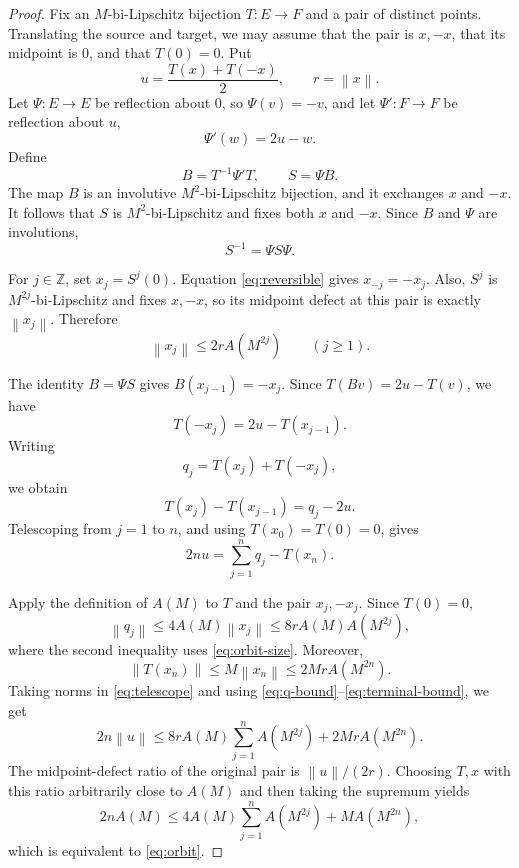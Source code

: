 \documentclass[11pt]{article}
\theoremstyle{remark}
\newcommand{\norm}[1]{\left\lVert #1\right\rVert}
\begin{document}
\begin{proof}
Fix an $M$-bi-Lipschitz bijection $T:E\to F$ and a pair of distinct
points.  Translating the source and target, we may assume that the pair is
$x,-x$, that its midpoint is $0$, and that $T(0)=0$.  Put
\[
 u=\frac{T(x)+T(-x)}2,
 \qquad r=\norm{x}.
\]
Let $\Psi:E\to E$ be reflection about $0$, so $\Psi(v)=-v$, and let
$\Psi':F\to F$ be reflection about $u$,
\[
 \Psi'(w)=2u-w.
\]
Define
\[
 B=T^{-1}\Psi'T,
 \qquad S=\Psi B.
\]
The map $B$ is an involutive $M^2$-bi-Lipschitz bijection, and it exchanges
$x$ and $-x$.  It follows that $S$ is $M^2$-bi-Lipschitz and fixes both
$x$ and $-x$.  Since $B$ and $\Psi$ are involutions,
\begin{equation}\label{eq:reversible}
 S^{-1}=\Psi S\Psi.
\end{equation}

For $j\in\mathbb Z$, set $x_j=S^j(0)$.  Equation
\eqref{eq:reversible} gives $x_{-j}=-x_j$.  Also, $S^j$ is
$M^{2j}$-bi-Lipschitz and fixes $x,-x$, so its midpoint defect at this pair
is exactly $\norm{x_j}$.  Therefore
\begin{equation}\label{eq:orbit-size}
 \norm{x_j}\le 2r A(M^{2j})
 \qquad(j\ge1).
\end{equation}

The identity $B=\Psi S$ gives $B(x_{j-1})=-x_j$.  Since
$T(Bv)=2u-T(v)$, we have
\[
 T(-x_j)=2u-T(x_{j-1}).
\]
Writing
\[
 q_j=T(x_j)+T(-x_j),
\]
we obtain
\[
 T(x_j)-T(x_{j-1})=q_j-2u.
\]
Telescoping from $j=1$ to $n$, and using $T(x_0)=T(0)=0$, gives
\begin{equation}\label{eq:telescope}
 2nu=\sum_{j=1}^nq_j-T(x_n).
\end{equation}

Apply the definition of $A(M)$ to $T$ and the pair $x_j,-x_j$.  Since
$T(0)=0$,
\begin{equation}\label{eq:q-bound}
 \norm{q_j}\le4A(M)\norm{x_j}
 \le8rA(M)A(M^{2j}),
\end{equation}
where the second inequality uses \eqref{eq:orbit-size}.  Moreover,
\begin{equation}\label{eq:terminal-bound}
 \norm{T(x_n)}\le M\norm{x_n}
 \le2MrA(M^{2n}).
\end{equation}
Taking norms in \eqref{eq:telescope} and using
\eqref{eq:q-bound}--\eqref{eq:terminal-bound}, we get
\[
 2n\norm{u}
 \le8rA(M)\sum_{j=1}^nA(M^{2j})
   +2MrA(M^{2n}).
\]
The midpoint-defect ratio of the original pair is $\norm{u}/(2r)$.
Choosing $T,x$ with this ratio arbitrarily close to $A(M)$ and then taking
the supremum yields
\[
 2nA(M)
 \le4A(M)\sum_{j=1}^nA(M^{2j})+MA(M^{2n}),
\]
which is equivalent to \eqref{eq:orbit}.
\end{proof}
\end{document}

